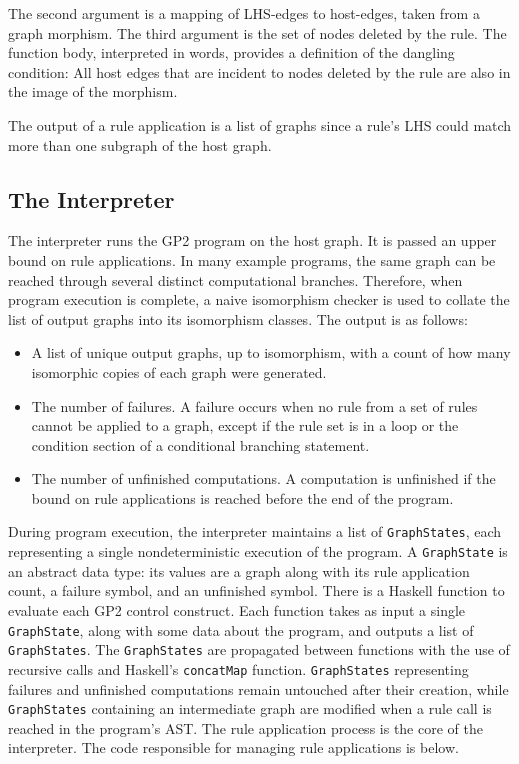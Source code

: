 The second argument is a mapping of LHS-edges to host-edges, taken from a graph morphism. The third argument is the set of nodes deleted by the rule. The function body, interpreted in words, provides a definition of the dangling condition: All host edges that are incident to nodes deleted by the rule are also in the image of the morphism. 

The output of a rule application is a list of graphs since a rule's LHS could match more than one subgraph of the host graph.

\subsection{The Interpreter}

The interpreter runs the GP2 program on the host graph. It is passed an upper bound on rule applications. In many example programs, the same graph can be reached through several distinct computational branches. Therefore, when program execution is complete, a naive isomorphism checker is used to collate the list of output graphs into its isomorphism classes. The output is as follows:

\begin{itemize}
\item A list of unique output graphs, up to isomorphism, with a count of how many isomorphic copies of each graph were generated.
\item The number of failures. A failure occurs when no rule from a set of rules cannot be applied to a graph, except if the rule set is in a loop or the condition section of a conditional branching statement.
\item The number of unfinished computations. A computation is unfinished if the bound on rule applications is reached before the end of the program.
\end{itemize}

During program execution, the interpreter maintains a list of \texttt{GraphStates}, each representing a single nondeterministic execution of the program. A \texttt{GraphState} is an abstract data type: its values are a graph along with its rule application count, a failure symbol, and an unfinished symbol. There is a Haskell function to evaluate each GP2 control construct. Each function takes as input a single \texttt{GraphState}, along with some data about the program, and outputs a list of \texttt{GraphStates}. The \texttt{GraphStates} are propagated between functions with the use of recursive calls and Haskell's \texttt{concatMap} function. \texttt{GraphStates} representing failures and unfinished computations remain untouched after their creation, while \texttt{GraphStates} containing an intermediate graph are modified when a rule call is reached in the program's AST. The rule application process is the core of the interpreter. The code responsible for managing rule applications is below.

